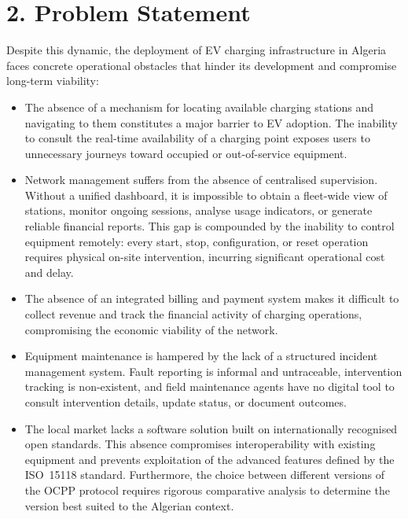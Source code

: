 \documentclass[12pt,a4paper]{report}
\begin{document}
\section*{2. Problem Statement}

Despite this dynamic, the deployment of EV charging infrastructure in Algeria faces concrete
operational obstacles that hinder its development and compromise long-term viability:

\begin{itemize}
  \item The absence of a mechanism for locating available charging stations and navigating
        to them constitutes a major barrier to EV adoption. The inability to consult the
        real-time availability of a charging point exposes users to unnecessary journeys
        toward occupied or out-of-service equipment.

  \item Network management suffers from the absence of centralised supervision. Without a
        unified dashboard, it is impossible to obtain a fleet-wide view of stations, monitor
        ongoing sessions, analyse usage indicators, or generate reliable financial reports.
        This gap is compounded by the inability to control equipment remotely: every start,
        stop, configuration, or reset operation requires physical on-site intervention,
        incurring significant operational cost and delay.

  \item The absence of an integrated billing and payment system makes it difficult to collect
        revenue and track the financial activity of charging operations, compromising the
        economic viability of the network.

  \item Equipment maintenance is hampered by the lack of a structured incident management
        system. Fault reporting is informal and untraceable, intervention tracking is
        non-existent, and field maintenance agents have no digital tool to consult
        intervention details, update status, or document outcomes.

  \item The local market lacks a software solution built on internationally recognised open
        standards. This absence compromises interoperability with existing equipment and
        prevents exploitation of the advanced features defined by the ISO~15118
        standard. Furthermore, the choice between different versions of the OCPP protocol
        requires rigorous comparative analysis to determine the version best suited to the
        Algerian context.
\end{itemize}
\end{document}
